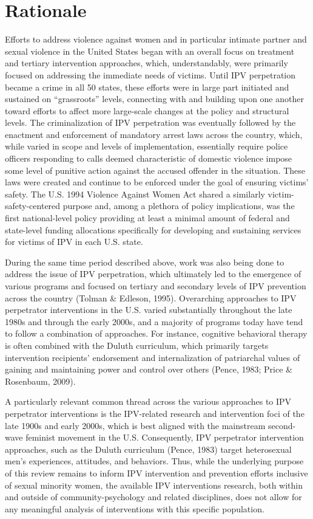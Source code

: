\documentclass[11pt,]{tufte-book}
\begin{document}
\doublespacing

\section{Rationale}\label{rationale}

Efforts to address violence against women and in particular intimate
partner and sexual violence in the United States began with an overall
focus on treatment and tertiary intervention approaches, which,
understandably, were primarily focused on addressing the immediate needs
of victims. Until IPV perpetration became a crime in all 50 states,
these efforts were in large part initiated and sustained on
``grassroots'' levels, connecting with and building upon one another
toward efforts to affect more large-scale changes at the policy and
structural levels. The criminalization of IPV perpetration was
eventually followed by the enactment and enforcement of mandatory arrest
laws across the country, which, while varied in scope and levels of
implementation, essentially require police officers responding to calls
deemed characteristic of domestic violence impose some level of punitive
action against the accused offender in the situation. These laws were
created and continue to be enforced under the goal of ensuring victims'
safety. The U.S. 1994 Violence Against Women Act shared a similarly
victim-safety-centered purpose and, among a plethora of policy
implications, was the first national-level policy providing at least a
minimal amount of federal and state-level funding allocations
specifically for developing and sustaining services for victims of IPV
in each U.S. state.

During the same time period described above, work was also being done to
address the issue of IPV perpetration, which ultimately led to the
emergence of various programs and focused on tertiary and secondary
levels of IPV prevention across the country (Tolman \& Edleson, 1995).
Overarching approaches to IPV perpetrator interventions in the U.S.
varied substantially throughout the late 1980s and through the early
2000s, and a majority of programs today have tend to follow a
combination of approaches. For instance, cognitive behavioral therapy is
often combined with the Duluth curriculum, which primarily targets
intervention recipients' endorsement and internalization of patriarchal
values of gaining and maintaining power and control over others (Pence,
1983; Price \& Rosenbaum, 2009).

A particularly relevant common thread across the various approaches to
IPV perpetrator interventions is the IPV-related research and
intervention foci of the late 1900s and early 2000s, which is best
aligned with the mainstream second-wave feminist movement in the U.S.
Consequently, IPV perpetrator intervention approaches, such as the
Duluth curriculum (Pence, 1983) target heterosexual men's experiences,
attitudes, and behaviors. Thus, while the underlying purpose of this
review remains to inform IPV intervention and prevention efforts
inclusive of sexual minority women, the available IPV interventions
research, both within and outside of community-psychology and related
disciplines, does not allow for any meaningful analysis of interventions
with this specific population.
\end{document}
